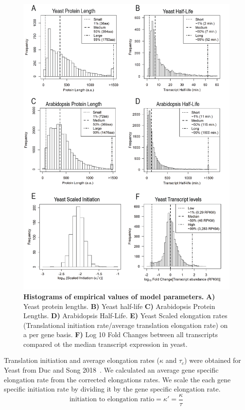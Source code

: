 \documentclass[10pt,letterpaper]{article}
\begin{document}
\begin{figure}[!h]
  \begin{center}
    \includegraphics[width=120mm]{Images/2023-07-04_parameter_histograms.png}
    \caption{{\bf Histograms of empirical values of model parameters.}
      {\bf A)} Yeast protein lengths. {\bf B)} Yeast half-life {\bf C)} Arabidopsis Protein Lengths. {\bf D)} Arabidopsis Half-Life. {\bf E)} Yeast Scaled elongation rates (Translational initiation rate/average translation elongation rate) on a per gene basis. {\bf F)} Log 10 Fold Changes between all transcripts compared ot the median transcript expression in yeast. }
    \label{fig2}
  \end{center}
\end{figure}


Translation initiation and average elongation rates ($\kappa$ and $\tau_c$) were obtained for Yeast from Duc and Song 2018~\cite{RN13}. 
We calculated an average gene specific elongation rate from the corrected elongations rates.
We scale the each gene specific initiation rate by dividing it by the gene specific elongation rate.
\begin{equation}
  \text{initiation to elongation ratio} = \kappa' = \frac{\kappa}{\tau}
\end{equation}
\end{document}
